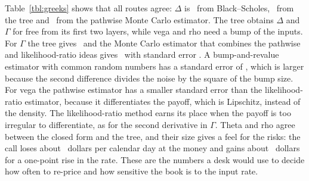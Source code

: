 Table~\ref{tbl:greeks} shows that all routes agree: $\Delta$ is \BSdelta\ from Black--Scholes, \TreeDelta\ from the tree and \MCdeltaPW\ from the pathwise Monte Carlo estimator.
The tree obtains $\Delta$ and $\Gamma$ for free from its first two layers, while vega and rho need a bump of the inputs.
For $\Gamma$ the tree gives \TreeGamma\ and the Monte Carlo estimator that combines the pathwise and likelihood-ratio ideas gives \MCgammaLR\ with standard error \MCgammaLRSE.
A bump-and-revalue estimator with common random numbers has a standard error of \MCgammaBumpSE, which is larger because the second difference divides the noise by the square of the bump size.
For vega the pathwise estimator has a smaller standard error than the likelihood-ratio estimator, because it differentiates the payoff, which is Lipschitz, instead of the density.
The likelihood-ratio method earns its place when the payoff is too irregular to differentiate, as for the second derivative in $\Gamma$.
Theta and rho agree between the closed form and the tree, and their size gives a feel for the risks: the call loses about \BSthetaDay\ dollars per calendar day at the money and gains about \BSrhoPct\ dollars for a one-point rise in the rate.
These are the numbers a desk would use to decide how often to re-price and how sensitive the book is to the input rate.
